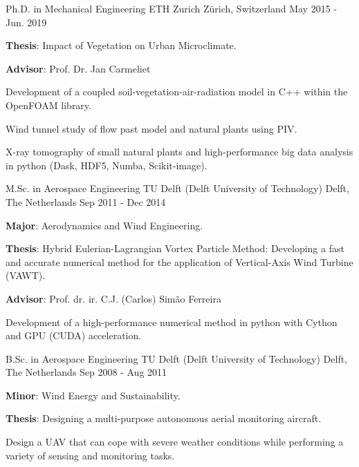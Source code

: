\documentclass[11pt, a4paper]{preamble/awesome-cv-novo}
\begin{document}
\begin{cventries}

  \cventry
    {Ph.D. in Mechanical Engineering} %
    {ETH Zurich} %
    {Z\"urich, Switzerland} %
    {May 2015 - Jun. 2019} %
    {
      \begin{cvitems} %
        \item {\textbf{Thesis}: Impact of Vegetation on Urban Microclimate.}
        \item {\textbf{Advisor}: Prof. Dr. Jan Carmeliet}
        \item {Development of a coupled soil-vegetation-air-radiation model in C++ within the OpenFOAM library.}
        \item {Wind tunnel study of flow past model and natural plants using PIV.}
        \item {X-ray tomography of small natural plants and high-performance big data analysis in python (Dask, HDF5, Numba, Scikit-image).}
      \end{cvitems}
    }

  \cventry
    {M.Sc. in Aerospace Engineering}
    {TU Delft (Delft University of Technology)}
    {Delft, The Netherlands}
    {Sep 2011 - Dec 2014}
    {
      \begin{cvitems}
        \item {\textbf{Major}: Aerodynamics and Wind Engineering.}
        \item {\textbf{Thesis}: Hybrid Eulerian-Lagrangian Vortex Particle Method: Developing a fast and accurate numerical method for the application of Vertical-Axis Wind Turbine (VAWT).}
        \item {\textbf{Advisor}: Prof. dr. ir. C.J. (Carlos) Simão Ferreira}
        \item {Development of a high-performance numerical method in python with Cython and GPU (CUDA) acceleration.}
      \end{cvitems}
    }

  \cventry
    {B.Sc. in Aerospace Engineering}
    {TU Delft (Delft University of Technology)}
    {Delft, The Netherlands}
    {Sep 2008 - Aug 2011}
    {
      \begin{cvitems}
        \item {\textbf{Minor}: Wind Energy and Sustainability.}
        \item {\textbf{Thesis}: Designing a multi-purpose autonomous aerial monitoring aircraft.}
        \item {Design a UAV that can cope with severe weather conditions while performing a variety of sensing and monitoring tasks.}
      \end{cvitems}
    }

\end{cventries}
\end{document}
